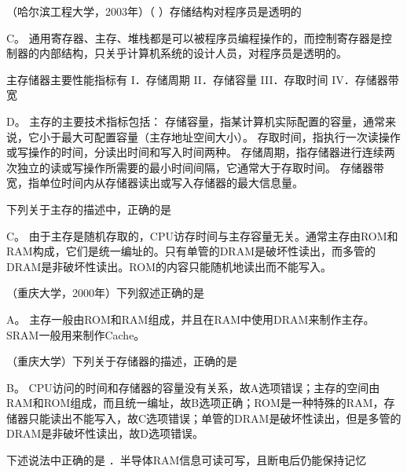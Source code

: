 \question （哈尔滨工程大学，2003年）（ ）存储结构对程序员是透明的
\par{}
\begin{solution}C。
通用寄存器、主存、堆栈都是可以被程序员编程操作的，而控制寄存器是控制器的内部结构，只关乎计算机系统的设计人员，对程序员是透明的。
\end{solution}
\question 主存储器主要性能指标有 I．存储周期 II．存储容量 III．存取时间
IV．存储器带宽
\par{}
\begin{solution}D。 主存的主要技术指标包括：
存储容量，指某计算机实际配置的容量，通常来说，它小于最大可配置容量（主存地址空间大小）。
存取时间，指执行一次读操作或写操作的时间，分读出时间和写入时间两种。
存储周期，指存储器进行连续两次独立的读或写操作所需要的最小时间间隔，它通常大于存取时间。
存储器带宽，指单位时间内从存储器读出或写入存储器的最大信息量。
\end{solution}
\question 下列关于主存的描述中，正确的是
\par{}
\begin{solution}C。
由于主存是随机存取的，CPU访存时间与主存容量无关。通常主存由ROM和RAM构成，它们是统一编址的。只有单管的DRAM是破坏性读出，而多管的DRAM是非破坏性读出。ROM的内容只能随机地读出而不能写入。
\end{solution}
\question （重庆大学，2000年）下列叙述正确的是
\par{}
\begin{solution}A。
主存一般由ROM和RAM组成，并且在RAM中使用DRAM来制作主存。SRAM一般用来制作Cache。
\end{solution}
\question （重庆大学）下列关于存储器的描述，正确的是
\par{}
\begin{solution}B。
CPU访问的时间和存储器的容量没有关系，故A选项错误；主存的空间由RAM和ROM组成，而且统一编址，故B选项正确；ROM是一种特殊的RAM，存储器只能读出不能写入，故C选项错误；单管的DRAM是破坏性读出，但是多管的DRAM是非破坏性读出，故D选项错误。
\end{solution}
\question 下述说法中正确的是 ．半导体RAM信息可读可写，且断电后仍能保持记忆
